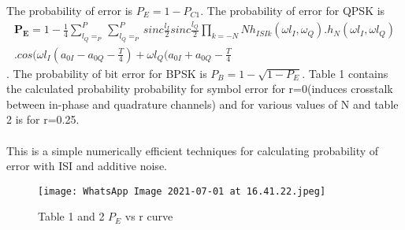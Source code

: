 \documentclass{beamer}
\renewcommand{\vec}[1]{\mathbf{#1}}
\begin{document}
\begin{frame}
    \begin{block}
    The probability of error is $P_E=1-P_{C1}$. The probability of error for QPSK is
    \begin{align}
        \vec{P_E}=1-\frac{1}{4}\sum_{l_Q=_P}^{P}\sum_{l_Q=_P}^{P}sinc\frac{l_I}{2}sinc\frac{l_Q}{2}\prod_{k=-N}{N}h_{ISIk}(\omega l_I,\omega_Q).h_N(\omega l_I,\omega l_Q)\\.cos(\omega l_I(a_{0I}-a_{0Q}-\frac{T}{4})+\omega l_Q(a_{0I}+a_{0Q}-\frac{T}{4}
    \end{align}. The probability of bit error for BPSK is $P_B=1-\sqrt{1-P_E}$.
    Table 1 contains the calculated probability probability for symbol error for r=0(induces crosstalk between in-phase and quadrature channels) and for various values of N and table 2 is for r=0.25.\\\\
    This is a simple numerically efficient techniques for calculating probability of error with ISI and additive noise.
    \end{block}
\end{frame}
\begin{figure}[htp]
    \centering
    \texttt{[image: WhatsApp Image 2021-07-01 at 16.41.22.jpeg]}
    \caption{Table 1 and 2 $P_E$ vs r curve}
    \label{fig:galaxy}
\end{figure}
\end{document}
